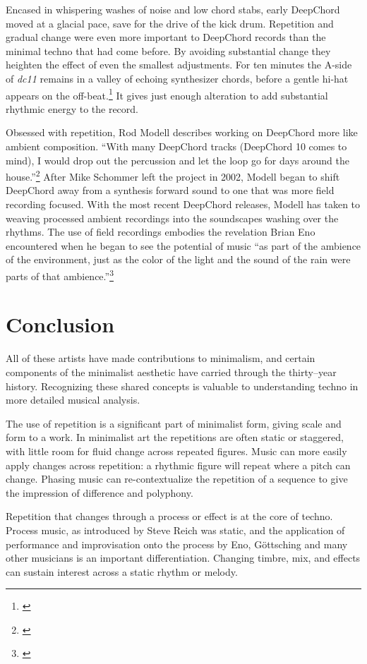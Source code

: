 \documentclass[12pt,twoside]{reedthesis}
\begin{document}
Encased in whispering washes of noise and low chord stabs, early DeepChord moved at a glacial pace, save for the drive of the kick drum. Repetition and gradual change were even more important to DeepChord records than the minimal techno that had come before.  By avoiding substantial change they heighten the effect of even the smallest adjustments. For ten minutes the A-side of \emph{dc11} remains in a valley of echoing synthesizer chords, before a gentle hi-hat appears on the off-beat.\footnote{\cite{deepchordDc112001}} It gives just enough alteration to add substantial rhythmic energy to the record.

Obsessed with repetition, Rod Modell describes working on DeepChord more like ambient composition. ``With many DeepChord tracks (DeepChord 10 comes to mind), I would drop out the percussion and let the loop go for days around the house.''\footnote{\cite{TenQuestionsDeepchord2007}} After Mike Schommer left the project in 2002, Modell began to shift DeepChord away from a synthesis forward sound to one that was more field recording focused. With the most recent DeepChord releases, Modell has taken to weaving processed ambient recordings into the soundscapes washing over the rhythms. The use of field recordings embodies the revelation Brian Eno encountered when he began to see the potential of music ``as part of the ambience of the environment, just as the color of the light and the sound of the rain were parts of that ambience.''\footnote{\cite{enoDiscreetMusicLiner}}

\section{Conclusion}

All of these artists have made contributions to minimalism, and certain components of the minimalist aesthetic have carried through the thirty--year history. Recognizing these shared concepts is valuable to understanding techno in more detailed musical analysis.

The use of repetition is a significant part of minimalist form, giving scale and form to a work. In minimalist art the repetitions are often static or staggered, with little room for fluid change across repeated figures. Music can more easily apply changes across repetition: a rhythmic figure will repeat where a pitch can change. Phasing music can re-contextualize the repetition of a sequence to give the impression of difference and polyphony.

Repetition that changes through a process or effect is at the core of techno. Process music, as introduced by Steve Reich was static, and the application of performance and improvisation onto the process by Eno, G{\"o}ttsching and many other musicians is an important differentiation. Changing timbre, mix, and effects can sustain interest across a static rhythm or melody.
\end{document}

